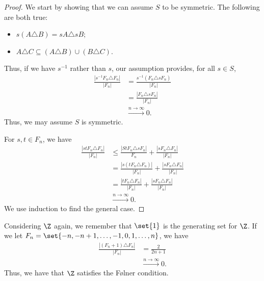 \documentclass[10pt]{mypackage}
\begin{document}
\begin{proof}
  We start by showing that we can assume $S$ to be symmetric. The following are both true:
  \begin{itemize}
    \item $s\left(A\triangle B\right) = sA\triangle sB$;
    \item $A\triangle C\subseteq \left(A\triangle B\right)\cup \left(B\triangle C\right)$. 
  \end{itemize}
  Thus, if we have $s^{-1}$ rather than $s$, our assumption provides, for all $s\in S$,
  \begin{align*}
    \frac{\left\vert s^{-1}F_n\triangle F_n \right\vert}{\left\vert F_n \right\vert} &= \frac{s^{-1}\left(F_n\triangle sF_n\right)}{\left\vert F_n \right\vert}\\
                                                                                     &= \frac{\left\vert F_n\triangle sF_n \right\vert}{\left\vert F_n \right\vert}\\
                                                                                     &\xrightarrow{n\rightarrow \infty}0.
  \end{align*}
  Thus, we may assume $S$ is symmetric.\newline

  For $s,t\in F_n$, we have
  \begin{align*}
    \frac{\left\vert stF_n\triangle F_n \right\vert}{\left\vert F_n \right\vert} &\leq \frac{\left\vert StF_n\triangle sF_n \right\vert}{F_n} + \frac{\left\vert sF_n\triangle F_n \right\vert}{\left\vert F_n \right\vert}\\
                                                                                 &= \frac{\left\vert s\left(tF_n\triangle F_n\right) \right\vert}{\left\vert F_n \right\vert} + \frac{\left\vert sF_n\triangle F_n \right\vert}{\left\vert F_n \right\vert}\\
                                                                                 &= \frac{\left\vert tF_n\triangle F_n \right\vert}{\left\vert F_n \right\vert} + \frac{\left\vert sF_n\triangle F_n \right\vert}{\left\vert F_n \right\vert}\\
                                                                                 &\xrightarrow{n\rightarrow\infty} 0.
  \end{align*}
  We use induction to find the general case.
\end{proof}
\begin{example}
  Considering $\Z$ again, we remember that $\set{1}$ is the generating set for $\Z$. If we let $F_n = \set{-n,-n+1,\dots,-1,0,1,\dots,n}$, we have
  \begin{align*}
    \frac{\left\vert \left(F_{n} + 1\right)\triangle F_n \right\vert}{\left\vert F_n \right\vert} &= \frac{2}{2n+1}\\
                                                                                                  &\xrightarrow{n\rightarrow\infty} 0.
  \end{align*}
  Thus, we have that $\Z$ satisfies the Følner condition.
\end{example}
\end{document}
